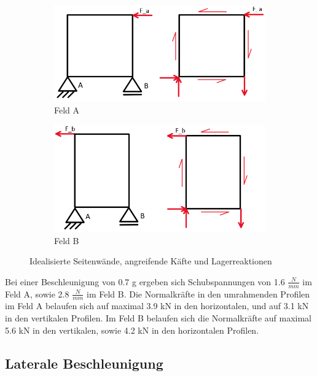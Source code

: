   \begin{figure}[!ht]
    \centering
      \begin{subfigure}[b]{0.5\textwidth}
         \includegraphics[width=1\linewidth]{04_Figures/1.2 Feld A}
         \caption{Feld A}
         \label{Feld A}
      \end{subfigure}
      \begin{subfigure}[b]{0.5\textwidth}
         \includegraphics[width=1\linewidth]{04_Figures/1.2 Feld B}
         \caption{Feld B}
         \label{Feld B}
      \end{subfigure}
    \caption{Idealisierte Seitenwände, angreifende Käfte und Lagerreaktionen}
    \label{1.2 Felder}
  \end{figure}

  Bei einer Beschleunigung von 0.7 g ergeben sich Schubspannungen von 1.6 $\frac{N}{mm}$ im Feld A, sowie 2.8 $\frac{N}{mm}$ im Feld B. Die Normalkräfte in den umrahmenden Profilen im Feld A belaufen sich auf maximal 3.9 kN in den horizontalen, und auf 3.1 kN in den vertikalen Profilen. Im Feld B belaufen sich die Normalkräfte auf maximal 5.6 kN in den vertikalen, sowie 4.2 kN in den horizontalen Profilen.


\subsection{Laterale Beschleunigung}
\label{1.4 Laterale Beschleunigung}
